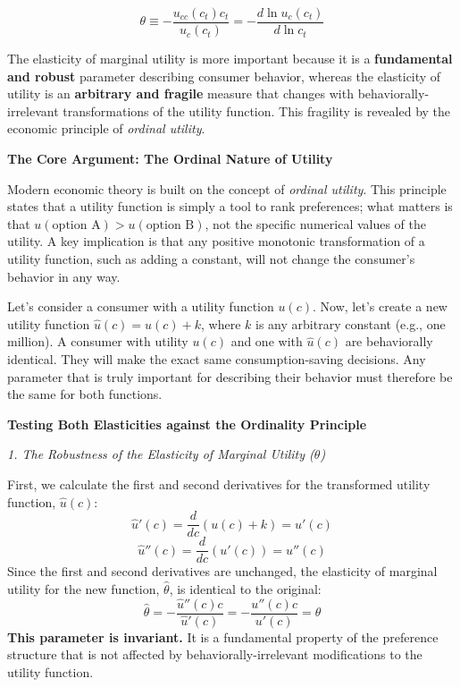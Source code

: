 \begin{remark*}
    \[
        \theta \equiv -\frac{u_{cc}(c_t)c_t}{u_c(c_t)} = -\frac{d\ln u_c(c_t)}{d\ln c_t}
    \]


    The elasticity of marginal utility is more important because it is a \textbf{fundamental and robust} parameter describing consumer behavior, whereas the elasticity of utility is an \textbf{arbitrary and fragile} measure that changes with behaviorally-irrelevant transformations of the utility function. This fragility is revealed by the economic principle of \emph{ordinal utility}.

    \noindent\textbf{The Core Argument: The Ordinal Nature of Utility}

    Modern economic theory is built on the concept of \emph{ordinal utility}. This principle states that a utility function is simply a tool to rank preferences; what matters is that $u(\text{option A}) > u(\text{option B})$, not the specific numerical values of the utility. A key implication is that any positive monotonic transformation of a utility function, such as adding a constant, will not change the consumer's behavior in any way.

    Let's consider a consumer with a utility function $u(c)$. Now, let's create a new utility function $\hat{u}(c) = u(c) + k$, where $k$ is any arbitrary constant (e.g., one million). A consumer with utility $u(c)$ and one with $\hat{u}(c)$ are behaviorally identical. They will make the exact same consumption-saving decisions. Any parameter that is truly important for describing their behavior must therefore be the same for both functions.

    \noindent\textbf{Testing Both Elasticities against the Ordinality Principle}

    \noindent\textit{1. The Robustness of the Elasticity of Marginal Utility ($\theta$)}

    First, we calculate the first and second derivatives for the transformed utility function, $\hat{u}(c)$:
    $$ \hat{u}'(c) = \frac{d}{dc}(u(c) + k) = u'(c) $$
    $$ \hat{u}''(c) = \frac{d}{dc}(u'(c)) = u''(c) $$
    Since the first and second derivatives are unchanged, the elasticity of marginal utility for the new function, $\hat{\theta}$, is identical to the original:
    $$ \hat{\theta} = - \frac{\hat{u}''(c) c}{\hat{u}'(c)} = - \frac{u''(c) c}{u'(c)} = \theta $$
    \textbf{This parameter is invariant.} It is a fundamental property of the preference structure that is not affected by behaviorally-irrelevant modifications to the utility function.


\end{remark*}
